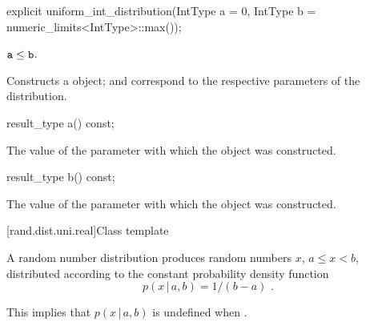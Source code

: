 %
\begin{itemdecl}
explicit uniform_int_distribution(IntType a = 0, IntType b = numeric_limits<IntType>::max());
\end{itemdecl}

\begin{itemdescr}
\pnum\requires
 $\texttt{a} \leq \texttt{b}$.

\pnum\effects Constructs a  object;
  and 
 correspond to the respective parameters of the distribution.
\end{itemdescr}

%
\begin{itemdecl}
result_type a() const;
\end{itemdecl}

\begin{itemdescr}
\pnum\returns The value of the  parameter
 with which the object was constructed.
\end{itemdescr}

%
\begin{itemdecl}
result_type b() const;
\end{itemdecl}

\begin{itemdescr}
\pnum\returns The value of the  parameter
 with which the object was constructed.
\end{itemdescr}


[rand.dist.uni.real]{Class template }%
%
%

\pnum
A  random number distribution
produces random numbers $x$,
$a \leq x < b$,
distributed according to
the constant probability density function%
%
%
\[ p(x\,|\,a,b) = 1 / (b - a) \text{ .} \]
\begin{note}
This implies that $p(x\,|\,a,b)$ is undefined when .
\end{note}

